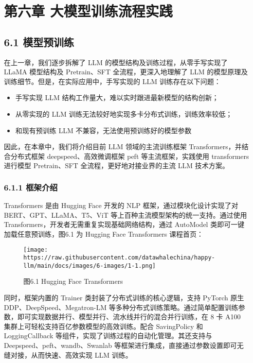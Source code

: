 \documentclass[
]{article}
\author{}
\date{}
\providecommand{\tightlist}{%
  \setlength{\itemsep}{0pt}\setlength{\parskip}{0pt}}
\begin{document}
{
\setcounter{tocdepth}{3}
\tableofcontents
}
\section{第六章
大模型训练流程实践}\label{ux7b2cux516dux7ae0-ux5927ux6a21ux578bux8badux7ec3ux6d41ux7a0bux5b9eux8df5}

\subsection{6.1 模型预训练}\label{ux6a21ux578bux9884ux8badux7ec3}

在上一章，我们逐步拆解了 LLM 的模型结构及训练过程，从零手写实现了 LLaMA
模型结构及 Pretrain、SFT 全流程，更深入地理解了 LLM
的模型原理及训练细节。但是，在实际应用中，手写实现的 LLM
训练存在以下问题：

\begin{itemize}
\tightlist
\item
  手写实现 LLM 结构工作量大，难以实时跟进最新模型的结构创新；
\item
  从零实现的 LLM 训练无法较好地实现多卡分布式训练，训练效率较低；
\item
  和现有预训练 LLM 不兼容，无法使用预训练好的模型参数
\end{itemize}

因此，在本章中，我们将介绍目前 LLM 领域的主流训练框架
Transformers，并结合分布式框架 deepspeed、高效微调框架 peft
等主流框架，实践使用 transformers 进行模型 Pretrain、SFT
全流程，更好地对接业界的主流 LLM 技术方案。

\subsubsection{6.1.1 框架介绍}\label{ux6846ux67b6ux4ecbux7ecd}

Transformers 是由 Hugging Face 开发的 NLP 框架，通过模块化设计实现了对
BERT、GPT、LLaMA、T5、ViT 等上百种主流模型架构的统一支持。通过使用
Transformers，开发者无需重复实现基础网络结构，通过 AutoModel
类即可一键加载任意预训练，图6.1 为 Hugging Face Transformers 课程首页：

\begin{figure}[htbp]\centering
\texttt{[image: https://raw.githubusercontent.com/datawhalechina/happy-llm/main/docs/images/6-images/1-1.png]}
\caption{图6.1 Hugging Face Transformers}
\end{figure}

同时，框架内置的 Trainer 类封装了分布式训练的核心逻辑，支持 PyTorch 原生
DDP、DeepSpeed、Megatron-LM
等多种分布式训练策略。通过简单配置训练参数，即可实现数据并行、模型并行、流水线并行的混合并行训练，在
8 卡 A100 集群上可轻松支持百亿参数模型的高效训练。配合 SavingPolicy 和
LoggingCallback 等组件，实现了训练过程的自动化管理。其还支持与
Deepspeed、peft、wandb、Swanlab
等框架进行集成，直接通过参数设置即可无缝对接，从而快速、高效实现 LLM
训练。
\end{document}
